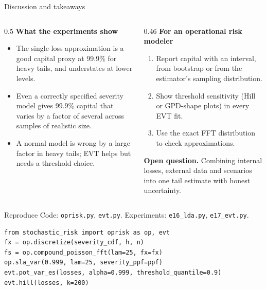 \documentclass[aspectratio=169,10pt]{beamer}
\begin{document}
\begin{frame}{Discussion and takeaways}
  \small
  \begin{columns}[T]
    \begin{column}{0.5\textwidth}
      \textbf{What the experiments show}
      \begin{itemize}
        \item The single-loss approximation is a good capital proxy at 99.9\% for heavy tails, and understates at lower levels.
        \item Even a correctly specified severity model gives 99.9\% capital that varies by a factor of several across samples of realistic size.
        \item A normal model is wrong by a large factor in heavy tails; EVT helps but needs a threshold choice.
      \end{itemize}
    \end{column}
    \begin{column}{0.46\textwidth}
      \textbf{For an operational risk modeler}
      \begin{enumerate}
        \item Report capital with an interval, from bootstrap or from the estimator's sampling distribution.
        \item Show threshold sensitivity (Hill or GPD-shape plots) in every EVT fit.
        \item Use the exact FFT distribution to check approximations.
      \end{enumerate}
      \textbf{Open question.} Combining internal losses, external data and scenarios into one tail estimate with honest uncertainty.
    \end{column}
  \end{columns}
\end{frame}

\begin{frame}[fragile]{Reproduce}
  \small
  Code: \texttt{oprisk.py}, \texttt{evt.py}. Experiments: \texttt{e16\_lda.py}, \texttt{e17\_evt.py}.
\begin{verbatim}
from stochastic_risk import oprisk as op, evt
fx = op.discretize(severity_cdf, h, n)
fs = op.compound_poisson_fft(lam=25, fx=fx)
op.sla_var(0.999, lam=25, severity_ppf=ppf)
evt.pot_var_es(losses, alpha=0.999, threshold_quantile=0.9)
evt.hill(losses, k=200)
\end{verbatim}
\end{frame}

\deckreferences
\end{document}
